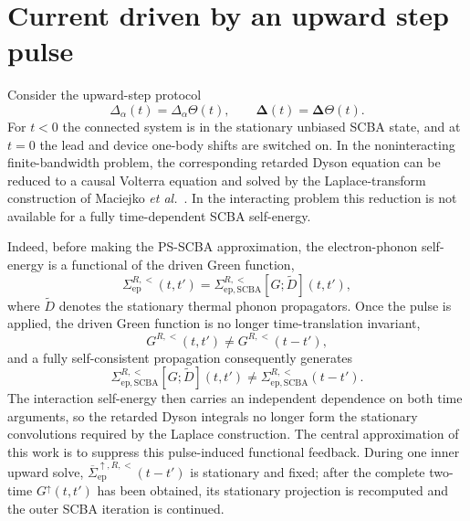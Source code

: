 \documentclass[
 reprint,
 superscriptaddress,
 amsmath,amssymb,
 aps,prb,
 longbibliography,
 floatfix
]{revtex4-2}
\newcommand{\ep}{\mathrm{ep}}
\newcommand{\barSigma}{\overline{\Sigma}}
\begin{document}
\section{Current driven by an upward step pulse}
\label{sec:up}

Consider the upward-step protocol
\begin{equation*}
\Delta_\alpha(t)=\Delta_\alpha\Theta(t),
\qquad
\bm\Delta(t)=\bm\Delta\Theta(t).
\end{equation*}
For $t<0$ the connected system is in the stationary unbiased SCBA state, and at $t=0$ the lead and device one-body shifts are switched on. In the noninteracting finite-bandwidth problem, the corresponding retarded Dyson equation can be reduced to a causal Volterra equation and solved by the Laplace-transform construction of Maciejko \textit{et al.}~\cite{MaciejkoWangGuo2006}. In the interacting problem this reduction is not available for a fully time-dependent SCBA self-energy.

Indeed, before making the PS-SCBA approximation, the electron-phonon self-energy is a functional of the driven Green function,
\begin{equation*}
\Sigma_{\ep}^{R,<}(t,t')
=
\Sigma_{\ep,\mathrm{SCBA}}^{R,<}
\!\left[G;\widetilde D\right](t,t'),
\end{equation*}
where $\widetilde D$ denotes the stationary thermal phonon propagators. Once the pulse is applied, the driven Green function is no longer time-translation invariant,
\begin{equation*}
G^{R,<}(t,t')\neq G^{R,<}(t-t'),
\end{equation*}
and a fully self-consistent propagation consequently generates
\begin{equation*}
\Sigma_{\ep,\mathrm{SCBA}}^{R,<}
\!\left[G;\widetilde D\right](t,t')
\neq
\Sigma_{\ep,\mathrm{SCBA}}^{R,<}(t-t').
\end{equation*}
The interaction self-energy then carries an independent dependence on both time arguments, so the retarded Dyson integrals no longer form the stationary convolutions required by the Laplace construction. The central approximation of this work is to suppress this pulse-induced functional feedback. During one inner upward solve, \(\barSigma_{\ep}^{\uparrow,R,<}(t-t')\) is stationary and fixed; after the complete two-time \(G^\uparrow(t,t')\) has been obtained, its stationary projection is recomputed and the outer SCBA iteration is continued.
\end{document}
